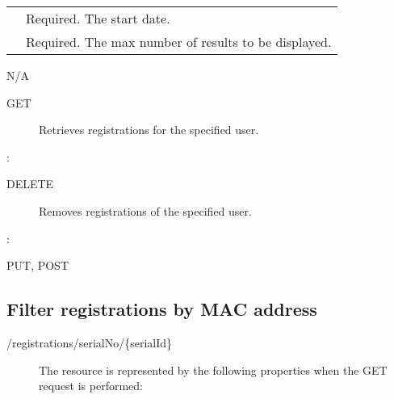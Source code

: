 \documentclass[letterpaper,10pt,english]{sphinxmanual}
\begin{document}


\begin{savenotes}\sphinxattablestart
\centering
\begin{tabulary}{\linewidth}[t]{|T|T|}
\hline

&
\\
\hline
{}
&
Required. The start date.
\\
\hline
{}
&
Required. The max number of results to be displayed.
\\
\hline
\end{tabulary}
\par
\sphinxattableend\end{savenotes}

 N/A
\begin{description}
\item[{ GET}] \leavevmode
Retrieves registrations for the specified user.

\end{description}

:

\begin{sphinxVerbatim}[commandchars=\\\{\}]
\end{sphinxVerbatim}
\begin{description}
\item[{ DELETE}] \leavevmode
Removes registrations of the specified user.

\end{description}

:

\begin{sphinxVerbatim}[commandchars=\\\{\}]
\end{sphinxVerbatim}

 PUT, POST


\subsection{Filter registrations by MAC address}
\label{\detokenize{restapi:filter-registrations-by-mac-address}}
 /registrations/serialNo/\{serialId\}
\begin{description}
\item[{}] \leavevmode
The resource is represented by the following properties when the GET request is performed:

\end{description}
\end{document}
